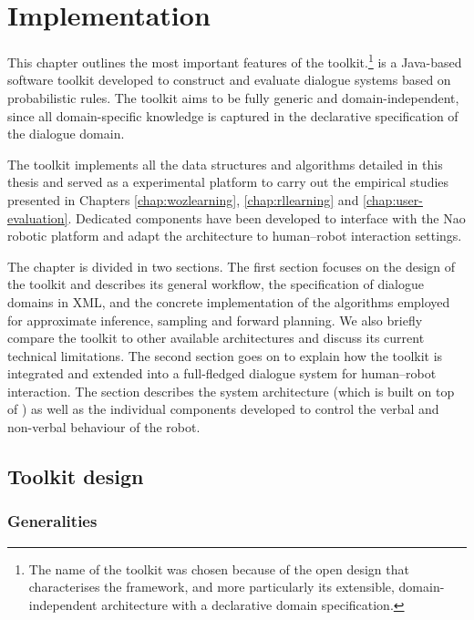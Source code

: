 \chapter{Implementation}
\label{chap:opendial}

This chapter outlines the most important features of the \opendial{} toolkit.\footnote{The name of the toolkit was chosen because of the open design that characterises the framework, and more particularly its extensible, domain-independent architecture with a declarative domain specification.} \opendial{} is a Java-based software toolkit developed to construct and evaluate dialogue systems based on probabilistic rules. The toolkit aims to be fully generic and domain-independent, since all domain-specific knowledge is captured in the declarative specification of the dialogue domain.

The toolkit implements all the data structures and algorithms detailed in this thesis and served as a experimental platform to carry out the empirical studies presented in Chapters \ref{chap:wozlearning}, \ref{chap:rllearning} and \ref{chap:user-evaluation}. Dedicated components have been developed to interface \opendial{} with the Nao robotic platform and adapt the architecture to human--robot interaction settings.

The chapter is divided in two sections.  The first section focuses on the design of the \opendial{} toolkit and describes its general workflow, the specification of dialogue domains in XML, and the concrete implementation of the algorithms employed for approximate inference, sampling and forward planning. We also briefly compare the toolkit to other available architectures and discuss its current technical limitations.  The second section goes on to explain how the toolkit is integrated and extended into a full-fledged dialogue system for human--robot interaction. The section describes the system architecture (which is built on top of \opendial{}) as well as the individual components developed to control the verbal and non-verbal behaviour of the robot.  

\section{Toolkit design}
\label{sec:genarchitecture}

\subsection{Generalities}

